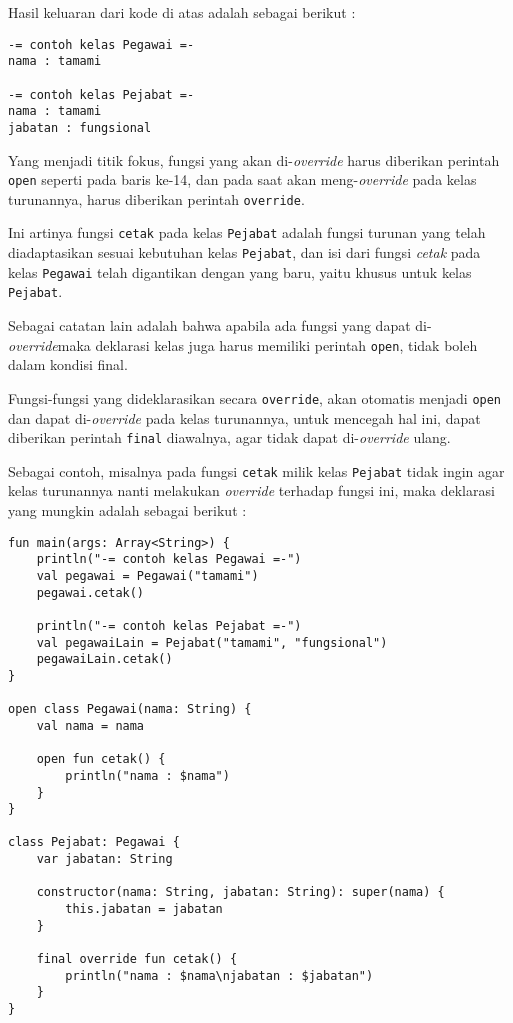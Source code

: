 Hasil keluaran dari kode di atas adalah sebagai berikut :

\begin{lstlisting}
-= contoh kelas Pegawai =-
nama : tamami

-= contoh kelas Pejabat =- 
nama : tamami
jabatan : fungsional
\end{lstlisting}

Yang menjadi titik fokus, fungsi yang akan di-\textit{override} harus diberikan perintah \texttt{open} seperti pada baris ke-14, dan pada saat akan meng-\textit{override} pada kelas turunannya, harus diberikan perintah \texttt{override}. 

Ini artinya fungsi \texttt{cetak} pada kelas \texttt{Pejabat} adalah fungsi turunan yang telah diadaptasikan sesuai kebutuhan kelas \texttt{Pejabat}, dan isi dari fungsi \textit{cetak} pada kelas \texttt{Pegawai} telah digantikan dengan yang baru, yaitu khusus untuk kelas \texttt{Pejabat}.

Sebagai catatan lain adalah bahwa apabila ada fungsi yang dapat di-\textit{override}maka deklarasi kelas juga harus memiliki perintah \texttt{open}, tidak boleh dalam kondisi final.

Fungsi-fungsi yang dideklarasikan secara \texttt{override}, akan otomatis menjadi \texttt{open} dan dapat di-\textit{override} pada kelas turunannya, untuk mencegah hal ini, dapat diberikan perintah \texttt{final} diawalnya, agar tidak dapat di-\textit{override} ulang.

Sebagai contoh, misalnya pada fungsi \texttt{cetak} milik kelas \texttt{Pejabat} tidak ingin agar kelas turunannya nanti melakukan \textit{override} terhadap fungsi ini, maka deklarasi yang mungkin adalah sebagai berikut :

\begin{lstlisting}
fun main(args: Array<String>) {
	println("-= contoh kelas Pegawai =-")
	val pegawai = Pegawai("tamami")
	pegawai.cetak()
	
	println("-= contoh kelas Pejabat =-")
	val pegawaiLain = Pejabat("tamami", "fungsional")
	pegawaiLain.cetak()
}

open class Pegawai(nama: String) {
	val nama = nama
	
	open fun cetak() {
		println("nama : $nama")
	}
}

class Pejabat: Pegawai {
	var jabatan: String
	
	constructor(nama: String, jabatan: String): super(nama) {
		this.jabatan = jabatan
	}
	
	final override fun cetak() {
		println("nama : $nama\njabatan : $jabatan")
	}
}
\end{lstlisting}

